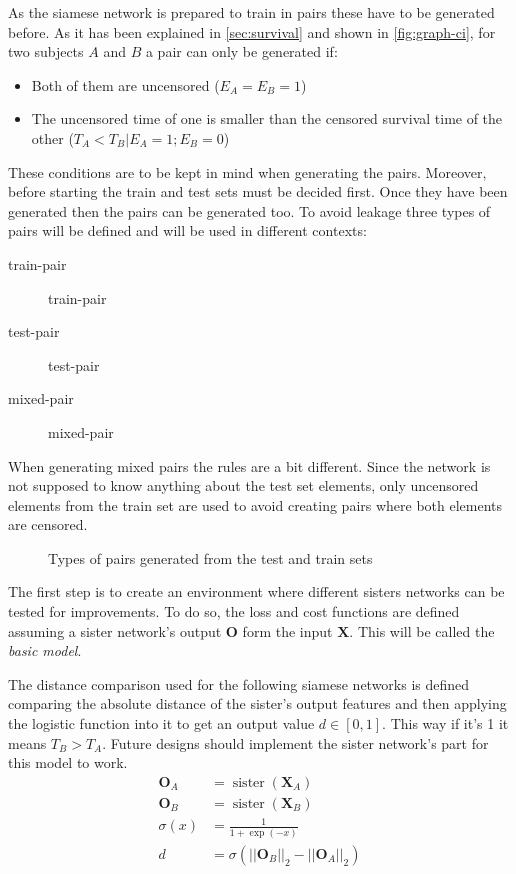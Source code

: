 
As the siamese network is prepared to train in pairs these have to be generated before. As
it has been explained in \autoref{sec:survival} and shown in \autoref{fig:graph-ci},
for two subjects \( A \) and \( B \) a pair can only be generated if:
\begin{itemize}[noitemsep, topsep=0pt]
  \item Both of them are uncensored (\( E_A = E_B = 1\))
  \item The uncensored time of one is smaller than the censored survival time of the other
  (\( T_A < T_B | E_A = 1; E_B = 0 \))
\end{itemize}

These conditions are to be kept in mind when generating the pairs. Moreover, before starting
the train and test sets must be decided first. Once they have been generated then the pairs
can be generated too. To avoid \gls{leakage} three types of pairs will be defined and will be
used in different contexts:
\begin{description}
  \item[\Gls{train-pair}] \glsdesc*{train-pair}
  \item[\Gls{test-pair}] \glsdesc*{test-pair}
  \item[\Gls{mixed-pair}] \glsdesc*{mixed-pair}
\end{description}

When generating mixed pairs the rules are a bit different. Since the network is not supposed
to know anything about the test set elements, only uncensored elements from the train set
are used to avoid creating pairs where both elements are censored.

\begin{figure}
  \centering
  
  \caption{Types of pairs generated from the test and train sets}
\end{figure}


\label{sec:basic-siamese}

The first step is to create an environment where different sisters networks can be tested
for improvements. To do so, the loss and cost functions are defined assuming a sister
network's output \( \bm{O} \) form the input \( \bm{X} \). This will be called the
\emph{basic model}.

The distance comparison used for the following siamese networks is defined comparing the 
absolute distance of the sister's output features and then applying the logistic function 
into it to get an output value \( d \in [0, 1] \). This way if it's 1 it means \( T_B > T_A \).
Future designs should implement the sister network's part for this model to work.
\begin{align*}
  \bm{O}_A &= \operatorname{sister}(\bm{X}_A) \\
  \bm{O}_B &= \operatorname{sister}(\bm{X}_B) \\
  \sigma(x) &= \frac{1}{1 + \exp(-x)} \\
  d &= \sigma(||\bm{O}_B||_2 - ||\bm{O}_A||_2) 
\end{align*}

